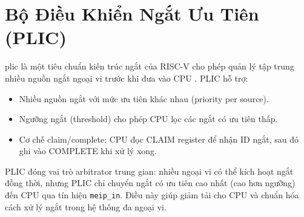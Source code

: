 \section{Bộ Điều Khiển Ngắt Ưu Tiên (PLIC)}

\acrfull{plic} là một tiêu chuẩn kiến trúc ngắt của RISC-V cho phép quản lý tập trung nhiều nguồn ngắt ngoại vi trước khi đưa vào CPU \cite{sifive-plic}. PLIC hỗ trợ:

\begin{itemize}
    \item Nhiều nguồn ngắt với mức ưu tiên khác nhau (priority per source).
    \item Ngưỡng ngắt (threshold) cho phép CPU lọc các ngắt có ưu tiên thấp.
    \item Cơ chế claim/complete: CPU đọc CLAIM register để nhận ID ngắt, sau đó ghi vào COMPLETE khi xử lý xong.
\end{itemize}

PLIC đóng vai trò arbitrator trung gian: nhiều ngoại vi có thể kích hoạt ngắt đồng thời, nhưng PLIC chỉ chuyển ngắt có ưu tiên cao nhất (cao hơn ngưỡng) đến CPU qua tín hiệu \texttt{meip\_in}. Điều này giúp giảm tải cho CPU và chuẩn hóa cách xử lý ngắt trong hệ thống đa ngoại vi.

